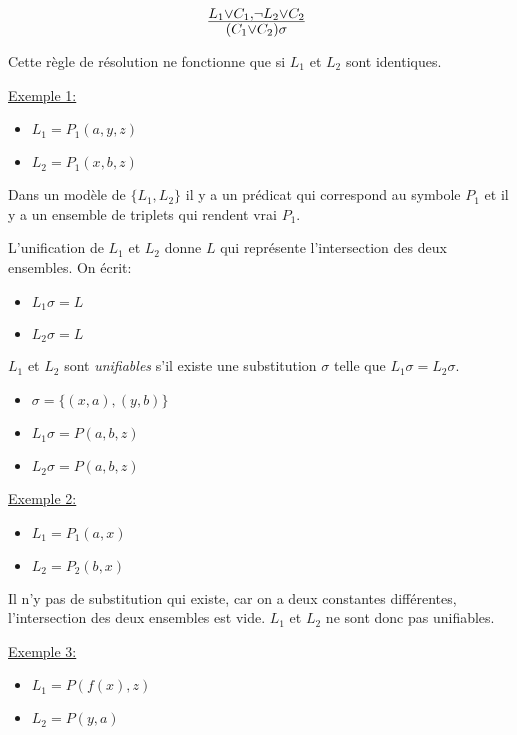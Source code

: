 {$$ \mbox{\Large $\frac{L_1 \vee C_1, \neg L_2 \vee C_2}{(C_1 \vee C_2)\sigma}$ } $$

Cette règle de résolution ne fonctionne que si $L_1$ et $L_2$ sont identiques.

\underline{Exemple 1:}

\begin{itemize}
  \item $L_1 = P_1(a, y, z)$
  \item $L_2 = P_1(x, b, z)$
\end{itemize}

Dans un modèle de $\{L_1, L_2\}$
il y a un prédicat qui correspond au symbole $P_1$ et il y a un ensemble de triplets qui rendent vrai $P_1$.

L'unification de $L_1$ et $L_2$ donne $L$ qui représente l'intersection des deux ensembles. On écrit:
\begin{itemize}
  \item $L_1 \sigma = L$
  \item $L_2 \sigma = L$
\end{itemize}

\vspace{5 mm}
$L_1$ et $L_2$ sont {\em unifiables} s'il existe une substitution $\sigma$ telle que $L_1 \sigma = L_2 \sigma$.
\begin{itemize}
  \item $\sigma = \big\{(x,a),(y,b)\big\}$
  \item $L_1 \sigma = P(a,b,z)$
  \item $L_2 \sigma = P(a,b,z)$
\end{itemize}

\vspace{5 mm}
\underline{Exemple 2:}
\begin{itemize}
  \item $L_1 = P_1(a,x)$
  \item $L_2 = P_2(b,x)$
\end{itemize}
Il n'y pas de substitution qui existe, car on a deux constantes différentes, l'intersection des deux ensembles est vide.
$L_1$ et $L_2$ ne sont donc pas unifiables.
\smallskip

\underline{Exemple 3:}

\begin{itemize}
  \item $L_1 = P(f(x), z)$ 
  \item $L_2 = P(y, a)$
\end{itemize}

}
